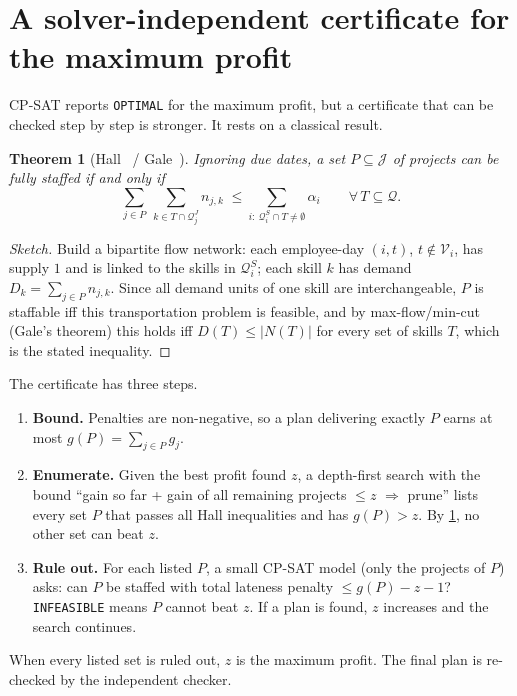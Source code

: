 \documentclass[10pt,a4paper]{article}
\theoremstyle{plain}
\newtheorem{theorem}[proposition]{Theorem}
\theoremstyle{definition}
\theoremstyle{remark}
\newcommand{\Q}{\mathcal{Q}}
\newcommand{\J}{\mathcal{J}}
\newcommand{\QS}[1]{\mathcal{Q}^{S}_{#1}}
\newcommand{\QJ}[1]{\mathcal{Q}^{J}_{#1}}
\newcommand{\V}[1]{\mathcal{V}_{#1}}
\newcommand{\avail}[1]{\alpha_{#1}}
\begin{document}
\section{A solver-independent certificate for the maximum profit}

CP-SAT reports \texttt{OPTIMAL} for the maximum profit, but a certificate that can be checked step by
step is stronger. It rests on a classical result.

\begin{theorem}[Hall~\cite{hall} / Gale~\cite{gale}]\label{thm:hall}
Ignoring due dates, a set $P\subseteq\J$ of projects can be fully staffed if and only if
\[
\sum_{j\in P}\ \sum_{k\in T\cap\QJ{j}} n_{j,k} \;\le \sum_{i:\ \QS{i}\cap T\neq\emptyset}\avail{i}
\qquad\forall\, T\subseteq\Q .
\]
\end{theorem}
\begin{proof}[Sketch]
Build a bipartite flow network: each employee-day $(i,t)$, $t\notin\V{i}$, has supply $1$ and is
linked to the skills in $\QS{i}$; each skill $k$ has demand $D_k=\sum_{j\in P}n_{j,k}$. Since all
demand units of one skill are interchangeable, $P$ is staffable iff this transportation problem is
feasible, and by max-flow/min-cut (Gale's theorem) this holds iff $D(T)\le|N(T)|$ for every set of
skills $T$, which is the stated inequality.
\end{proof}

\noindent The certificate has three steps.
\begin{enumerate}
  \item \textbf{Bound.} Penalties are non-negative, so a plan delivering exactly $P$ earns at most
        $g(P)=\sum_{j\in P}g_j$.
  \item \textbf{Enumerate.} Given the best profit found $z$, a depth-first search with the bound
        ``gain so far + gain of all remaining projects $\le z$ $\Rightarrow$ prune'' lists every
        set $P$ that passes all Hall inequalities and has $g(P)>z$. By \cref{thm:hall}, no other set
        can beat $z$.
  \item \textbf{Rule out.} For each listed $P$, a small CP-SAT model (only the projects of $P$)
        asks: can $P$ be staffed with total lateness penalty $\le g(P)-z-1$? \texttt{INFEASIBLE}
        means $P$ cannot beat $z$. If a plan is found, $z$ increases and the search continues.
\end{enumerate}
When every listed set is ruled out, $z$ is the maximum profit. The final plan is re-checked by the
independent checker.
\end{document}
